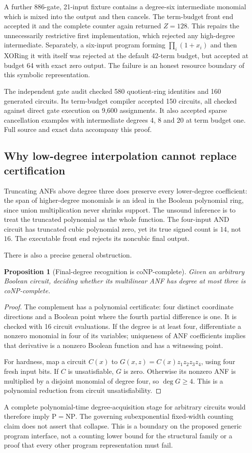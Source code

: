 \documentclass[11pt]{article}
\newtheorem{proposition}[theorem]{Proposition}
\theoremstyle{remark}\newtheorem{remark}[theorem]{Remark}
\begin{document}
A further 886-gate, 21-input fixture contains a degree-six intermediate monomial which is mixed into the output and then cancels. The term-budget front end accepted it and the complete counter again returned $Z=128$. This repairs the unnecessarily restrictive first implementation, which rejected any high-degree intermediate. Separately, a six-input program forming $\prod_i(1+x_i)$ and then XORing it with itself was rejected at the default 42-term budget, but accepted at budget 64 with exact zero output. The failure is an honest resource boundary of this symbolic representation.

The independent gate audit checked 580 quotient-ring identities and 160 generated circuits. Its term-budget compiler accepted 150 circuits, all checked against direct gate execution on 9,600 assignments. It also accepted sparse cancellation examples with intermediate degrees 4, 8 and 20 at term budget one. Full source and exact data accompany this proof.

\subsection{Why low-degree interpolation cannot replace certification}
Truncating ANFs above degree three does preserve every lower-degree coefficient: the span of higher-degree monomials is an ideal in the Boolean polynomial ring, since union multiplication never shrinks support. The unsound inference is to treat the truncated polynomial as the whole function. The four-input AND circuit has truncated cubic polynomial zero, yet its true signed count is $14$, not $16$. The executable front end rejects its noncubic final output.

There is also a precise general obstruction.
\begin{proposition}[Final-degree recognition is coNP-complete]
Given an arbitrary Boolean circuit, deciding whether its multilinear ANF has degree at most three is coNP-complete.
\end{proposition}
\begin{proof}
The complement has a polynomial certificate: four distinct coordinate directions and a Boolean point where the fourth partial difference is one. It is checked with 16 circuit evaluations. If the degree is at least four, differentiate a nonzero monomial in four of its variables; uniqueness of ANF coefficients implies that derivative is a nonzero Boolean function and has a witnessing point.

For hardness, map a circuit $C(x)$ to $G(x,z)=C(x)z_1z_2z_3z_4$, using four fresh input bits. If $C$ is unsatisfiable, $G$ is zero. Otherwise its nonzero ANF is multiplied by a disjoint monomial of degree four, so $\deg G\ge4$. This is a polynomial reduction from circuit unsatisfiability.
\end{proof}
A complete polynomial-time degree-acquisition stage for arbitrary circuits would therefore imply $\mathrm P=\mathrm{NP}$. The governing subexponential fixed-width counting claim does not assert that collapse. This is a boundary on the proposed generic program interface, not a counting lower bound for the structural family or a proof that every other program representation must fail.
\end{document}
